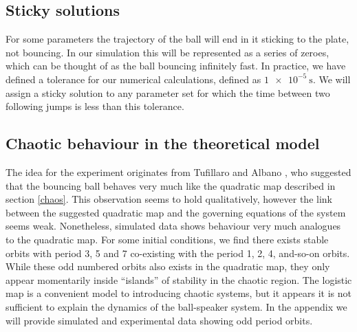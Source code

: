 \documentclass[12pt,oneside,a4paper]{article}
\numberwithin{equation}{section}
\begin{document}
{{{{\subsection{Sticky solutions}
For some parameters the trajectory of the ball will end in it sticking to the plate, not bouncing. In our simulation this will be represented as a series of zeroes, which can be thought of as the ball bouncing infinitely fast. In practice, we have defined a tolerance for our numerical calculations, defined as $\SI{1e-5}{\second}$. We will assign a sticky solution to any parameter set for which the time between two following jumps is less than this tolerance. 
\subsection{Chaotic behaviour in the theoretical model}
The idea for the experiment originates from Tufillaro and Albano \cite{tufillaro}, who suggested that the bouncing ball behaves very much like the quadratic map described in section \ref{chaos}. This observation seems to hold qualitatively, however the link between the suggested quadratic map and the governing equations of the system seems weak. Nonetheless, simulated data shows behaviour very much analogues to the quadratic map. For some initial conditions, we find there exists stable orbits with period 3, 5 and 7 co-existing with the period 1, 2, 4, and-so-on orbits. While these odd numbered orbits also exists in the quadratic map, they only appear momentarily inside ``islands'' of stability in the chaotic region. The logistic map is a convenient model to introducing chaotic systems, but it appears it is not sufficient to explain the dynamics of the ball-speaker system. In the appendix we will provide simulated and experimental data showing odd period orbits.

}}}}
\end{document}
